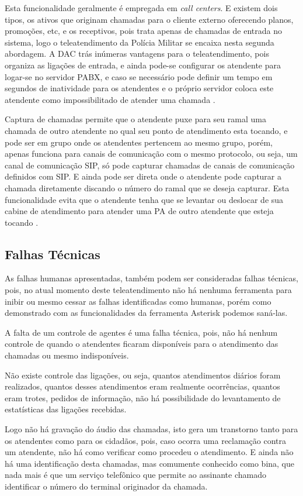 Esta funcionalidade geralmente é empregada em \textit{call centers}. E existem dois tipos, os ativos que originam chamadas para o cliente externo oferecendo planos, promoções, etc, e os receptivos, pois trata apenas de chamadas de entrada no sistema, logo o teleatendimento da Polícia Militar se encaixa nesta segunda abordagem. A DAC trás inúmeras vantagens para o teleatendimento, pois organiza as ligações de entrada, e ainda pode-se configurar os atendente para logar-se no servidor PABX, e caso se necessário pode definir um tempo em segundos de inatividade para os atendentes e o próprio servidor coloca este atendente como impossibilitado de atender uma chamada \cite{alexandrekeller2014}.

Captura de chamadas permite que o atendente puxe para seu ramal uma chamada de outro atendente no qual seu ponto de atendimento esta tocando, e pode ser em grupo onde os atendentes pertencem ao mesmo grupo, porém, apenas funciona para canais de comunicação com o mesmo protocolo, ou seja, um canal de comunicação SIP, só pode capturar chamadas de canais de comunicação definidos com SIP. E ainda pode ser direta onde o atendente pode capturar a chamada diretamente discando o número do ramal que se deseja capturar. Esta funcionalidade evita que o atendente tenha que se levantar ou deslocar de sua cabine de atendimento para atender uma PA de outro atendente que esteja tocando \cite{alexandrekeller2014}. 

\subsection{Falhas Técnicas}
As falhas humanas apresentadas, também podem ser consideradas falhas técnicas, pois, no atual momento deste teleatendimento não há nenhuma ferramenta para inibir ou mesmo cessar as falhas identificadas como humanas, porém como demonstrado com as funcionalidades da ferramenta Asterisk podemos saná-las.

A falta de um controle de agentes é uma falha técnica, pois, não há nenhum controle de quando o atendentes ficaram disponíveis para o atendimento das chamadas ou mesmo indisponíveis.

Não existe controle das ligações, ou seja, quantos atendimentos diários foram realizados, quantos desses atendimentos eram realmente ocorrências, quantos eram trotes, pedidos de informação, não há possibilidade do levantamento de estatísticas das ligações recebidas.

Logo não há gravação do áudio das chamadas, isto gera um transtorno tanto para os atendentes como para os cidadãos, pois, caso ocorra uma reclamação contra um atendente, não há como verificar como procedeu o atendimento. E ainda não há uma identificação desta chamadas, mas comumente conhecido como bina, que nada mais é que um serviço telefônico que permite ao assinante chamado identificar o número do terminal originador da chamada.

